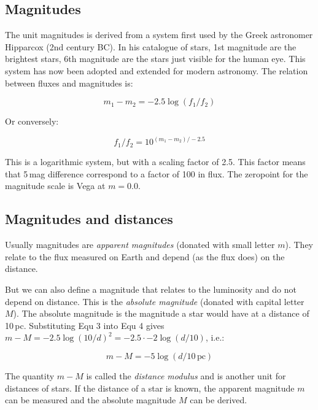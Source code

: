 \subsection{Magnitudes}

The unit magnitudes is derived from a system first used by the Greek astronomer Hipparcox (2nd century BC). In his catalogue of stars, 1st magnitude are the brightest stars, 6th magnitude are the stars just visible for the human eye. This system has now been adopted and extended for modern astronomy. The relation between fluxes and magnitudes is:

\begin{equation}
m_1 - m_2 = -2.5 \log{(f_1 / f_2)}
\end{equation}

Or conversely:

\begin{equation}
f_1 / f_2 = 10^{(m_1 - m_2) / -2.5}
\end{equation}

This is a logarithmic system, but with a scaling factor of 2.5. This factor means that 5\,mag difference correspond to a factor of 100 in flux. The zeropoint for the magnitude scale is Vega at $m = 0.0$.

\subsection{Magnitudes and distances}

Usually magnitudes are \textit{apparent magnitudes} (donated with small letter $m$). They relate to the flux measured on Earth and depend (as the flux does) on the distance. 

But we can also define a magnitude that relates to the luminosity and do not depend on distance. This is the \textit{absolute magnitude} (donated with capital letter $M$). The absolute magnitude is the magnitude a star would have at a distance of 10\,pc. Substituting Equ 3 into Equ 4 gives $m - M = -2.5 \log{ (10 / d)^2 } =   -2.5 \cdot -2 \log{(d/10)}$, i.e.:

\begin{equation}
m - M = -5 \log{(d/10\,\mathrm{pc})}
\end{equation}

The quantity $m-M$ is called the \textit{distance modulus} and is another unit for distances of stars. If the distance of a star is known, the apparent magnitude $m$ can be measured and the absolute magnitude $M$ can be derived. 

